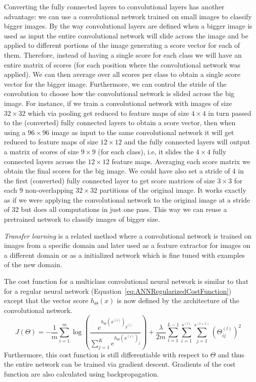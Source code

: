 Converting the fully connected layers to convolutional layers has another advantage: we can use a convolutional network trained on small images to classify bigger images. By the way convolutional layers are defined when a bigger image is used as input the entire convolutional network will slide across the image and be applied to different portions of the image generating a score vector for each of them. Therefore, instead of having a single score for each class we will have an entire matrix of scores (for each position where the convolutional network was applied). We can then average over all scores per class to obtain a single score vector for the bigger image. Furthermore, we can control the stride of the convolution to choose how the convolutional network is slided across the big image.
For instance, if we train a convolutional network with images of size $32\times 32$ which via pooling get reduced to feature maps of size $4\times 4$ in turn passed to the (converted) fully connected layers to obtain a score vector, then when using a $96\times 96$ image as input to the same convolutional network it will get reduced to feature maps of size $12 \times 12$ and the fully connected layers will output a matrix of scores of size $9\times 9$ (for each class), i.e, it slides the $4\times 4$ fully connected layers across the $12\times 12$ feature maps. Averaging each score matrix we obtain the final scores for the big image. We could have also  set a stride of 4 in the first (converted) fully connected layer to get score matrices of size $3\times 3$ for each 9 non-overlapping $32\times 32$ partitions of the original image. It works exactly as if we were applying the convolutional network to the original image at a stride of 32 but does all computations in just one pass. This way we can reuse a pretrained network to classify images of bigger size. 

\emph{Transfer learning} is a related method where a convolutional network is trained on images from a specific domain and later used as a feature extractor for images on a different domain or as a initialized network which is fine tuned with examples of the new domain.

The cost function for a multiclass convolutional neural network is similar to that for a regular neural network (Equation~\ref{eq:ANNRegularizedCostFunction}) except that the vector score $h_\Theta(x)$ is now defined by the architecture of the convolutional network.
\begin{equation}
	J(\Theta) = -\frac{1}{m} \sum_{i=1}^m \log \left ( \frac{ e^{h_\Theta(x^{(i)})_{y^{(i)}}} }{ \sum_{j=1}^K e^{ h_\Theta (x^{(i)})_j} } \right ) + \frac{\lambda}{2m}\sum_{l=1}^{L-1}\sum_{i=1}^{s^{(l)}}\sum_{j=1}^{s^{(l+1)}} \left(\Theta^{(l)}_{ij}\right)^2
	\label{eq:ConvNetCostFunction}
\end{equation}
Furthermore, this cost function is still differentiable with respect to $\Theta$ and thus the entire network can be trained via gradient descent. Gradients of the cost function are also calculated using backpropagation.

